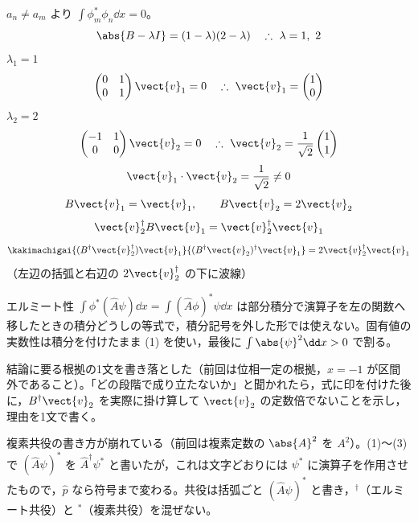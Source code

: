 $a_{n}\neq a_{m}$ より $\int\phi_{m}^{*}\phi_{n}\dd x=0$。
\[ \abs{B-\lambda I}=(1-\lambda)(2-\lambda)\quad\therefore\ \lambda=1,\ 2 \]
$\lambda_{1}=1$
\[ \begin{pmatrix}0&1\\0&1\end{pmatrix}\vect{v}_{1}=0\quad\therefore\ \vect{v}_{1}=\begin{pmatrix}1\\0\end{pmatrix} \]
$\lambda_{2}=2$
\[ \begin{pmatrix}-1&1\\0&0\end{pmatrix}\vect{v}_{2}=0\quad\therefore\ \vect{v}_{2}=\frac{1}{\sqrt{2}}\begin{pmatrix}1\\1\end{pmatrix} \]
\[ \vect{v}_{1}\cdot\vect{v}_{2}=\frac{1}{\sqrt{2}}\neq0 \]
\[ B\vect{v}_{1}=\vect{v}_{1},\qquad B\vect{v}_{2}=2\vect{v}_{2} \]
\[ \vect{v}_{2}^{\dagger}B\vect{v}_{1}=\vect{v}_{2}^{\dagger}\vect{v}_{1} \]
\[ \kakimachigai{(B^{\dagger}\vect{v}_{2}^{\dagger})\vect{v}_{1}}{(B^{\dagger}\vect{v}_{2})^{\dagger}\vect{v}_{1}}=2\vect{v}_{2}^{\dagger}\vect{v}_{1} \]
（左辺の括弧と右辺の $2\vect{v}_{2}^{\dagger}$ の下に波線）
\item エルミート性 $\int\phi^{*}(\hat{A}\psi)\dd x=\int(\hat{A}\phi)^{*}\psi\dd x$ は部分積分で演算子を左の関数へ移したときの積分どうしの等式で，積分記号を外した形では使えない。固有値の実数性は積分を付けたまま (1) を使い，最後に $\int\abs{\psi}^{2}\dd x>0$ で割る。
\item {} 結論に要る根拠の1文を書き落とした（前回は位相一定の根拠，$x=-1$ が区間外であること）。「どの段階で成り立たないか」と聞かれたら，式に印を付けた後に，$B^{\dagger}\vect{v}_{2}$ を実際に掛け算して $\vect{v}_{2}$ の定数倍でないことを示し，理由を1文で書く。
\item {} 複素共役の書き方が崩れている（前回は複素定数の $\abs{A}^{2}$ を $A^{2}$）。(1)〜(3) で $(\hat{A}\psi)^{*}$ を $\hat{A}^{\dagger}\psi^{*}$ と書いたが，これは文字どおりには $\psi^{*}$ に演算子を作用させたもので，$\hat{p}$ なら符号まで変わる。共役は括弧ごと $(\hat{A}\psi)^{*}$ と書き，$^{\dagger}$（エルミート共役）と $^{*}$（複素共役）を混ぜない。
